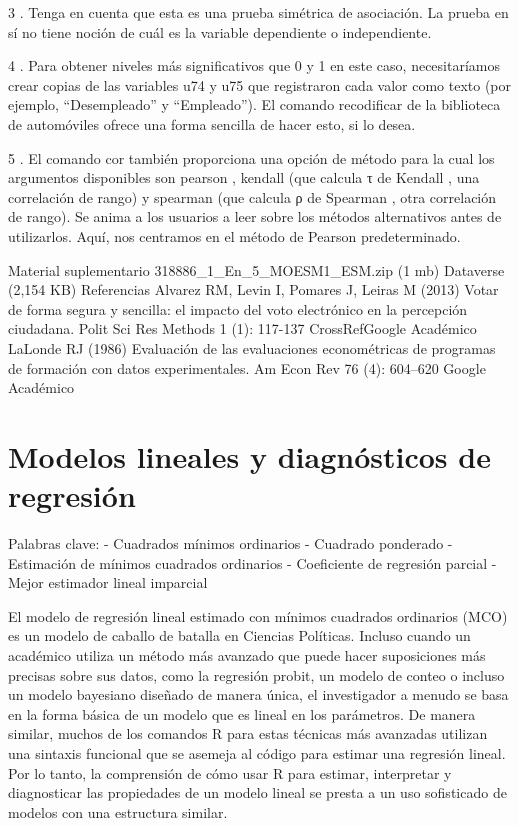 \documentclass[
]{book}
\begin{document}
3 .
Tenga en cuenta que esta es una prueba simétrica de asociación. La prueba en sí no tiene noción de cuál es la variable dependiente o independiente.

4 .
Para obtener niveles más significativos que 0 y 1 en este caso, necesitaríamos crear copias de las variables u74 y u75 que registraron cada valor como texto (por ejemplo, ``Desempleado'' y ``Empleado''). El comando recodificar de la biblioteca de automóviles ofrece una forma sencilla de hacer esto, si lo desea.

5 .
El comando cor también proporciona una opción de método para la cual los argumentos disponibles son pearson , kendall (que calcula τ de Kendall , una correlación de rango) y spearman (que calcula ρ de Spearman , otra correlación de rango). Se anima a los usuarios a leer sobre los métodos alternativos antes de utilizarlos. Aquí, nos centramos en el método de Pearson predeterminado.

Material suplementario
318886\_1\_En\_5\_MOESM1\_ESM.zip (1 mb)
Dataverse (2,154 KB)
Referencias
Alvarez RM, Levin I, Pomares J, Leiras M (2013) Votar de forma segura y sencilla: el impacto del voto electrónico en la percepción ciudadana. Polit Sci Res Methods 1 (1): 117-137
CrossRefGoogle Académico
LaLonde RJ (1986) Evaluación de las evaluaciones econométricas de programas de formación con datos experimentales. Am Econ Rev 76 (4): 604--620
Google Académico

\hypertarget{Modeloslinealesydiagnuxf3sticosderegresiuxf3n}{%
\chapter{Modelos lineales y diagnósticos de regresión}\label{Modeloslinealesydiagnuxf3sticosderegresiuxf3n}}

Palabras clave:
- Cuadrados mínimos ordinarios
- Cuadrado ponderado
- Estimación de mínimos cuadrados ordinarios
- Coeficiente de regresión parcial
- Mejor estimador lineal imparcial

El modelo de regresión lineal estimado con mínimos cuadrados ordinarios (MCO) es un modelo de caballo de batalla en Ciencias Políticas. Incluso cuando un académico utiliza un método más avanzado que puede hacer suposiciones más precisas sobre sus datos, como la regresión probit, un modelo de conteo o incluso un modelo bayesiano diseñado de manera única, el investigador a menudo se basa en la forma básica de un modelo que es lineal en los parámetros. De manera similar, muchos de los comandos R para estas técnicas más avanzadas utilizan una sintaxis funcional que se asemeja al código para estimar una regresión lineal. Por lo tanto, la comprensión de cómo usar R para estimar, interpretar y diagnosticar las propiedades de un modelo lineal se presta a un uso sofisticado de modelos con una estructura similar.
\end{document}
